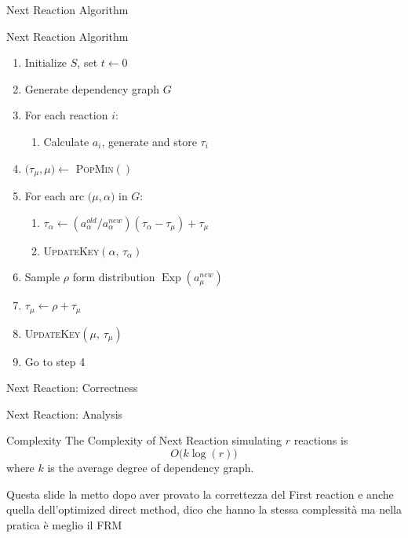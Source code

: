 \documentclass{beamer}
\DeclareMathOperator{\Exp}{\text{Exp}}
\begin{document}
\begin{frame}{Next Reaction Algorithm}
  \begin{block}{Next Reaction Algorithm}
    \begin{enumerate}
    \item Initialize $S$, set $t\leftarrow 0$
    \item Generate dependency graph $G$
    \item For each reaction $i$:
      \begin{enumerate}
      \item Calculate $a_i$, generate and store $\tau_i$
      \end{enumerate}
    \item $\bigl(\tau_\mu, \mu\bigr) \leftarrow$ \textsc{PopMin}$()$
    \item For each arc $\bigl(\mu, \alpha\bigr)$ in $G$:
      \begin{enumerate}
      \item $\tau_\alpha \leftarrow \left(a^{old}_\alpha \big/ a^{new}_\alpha\right)
        \left(\tau_\alpha - \tau_\mu\right) + \tau_\mu$
      \item \textsc{UpdateKey}$\left(\alpha, \, \tau_\alpha\right)$
      \end{enumerate}
    \item Sample $\rho$ form distribution $\Exp\left(a^{new}_\mu\right)$
    \item $\tau_\mu \leftarrow \rho + \tau_\mu$
    \item \textsc{UpdateKey}$\left(\mu, \, \tau_\mu\right)$
    \item Go to step 4
    \end{enumerate}
  \end{block}
\end{frame}

\begin{frame}{Next Reaction: Correctness}
  
\end{frame}

\begin{frame}{Next Reaction: Analysis}
  \begin{block}{Complexity}
    The Complexity of Next Reaction simulating $r$ reactions is
    $$ O\bigl(k \log(r)\bigr) $$
    where $k$ is the average degree of dependency graph.    
  \end{block}
  Questa slide la metto dopo aver provato la correttezza del First reaction e anche quella
  dell'optimized direct method, dico che hanno la stessa complessità ma nella pratica è meglio il FRM
\end{frame}
\end{document}
